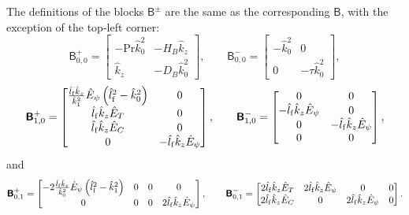 \documentclass{article}
\newcommand{\khat}{\hat{k}}
\newcommand{\lhatf}{\hat{l}_{\rm f}}
\newcommand{\Prd}{\mathrm{Pr}}
\newcommand{\HB}{H_{B}}
\newcommand{\DB}{D_{B}}
\newcommand{\EhatT}{\hat{E}_{T}}
\newcommand{\EhatC}{\hat{E}_{C}}
\newcommand{\Ehatp}{\hat{E}_{\psi}}
\newcommand{\Bmat}{\boldsymbol{\mathsf{B}}}
\begin{document}
%
The definitions of the blocks $\Bmat^{\pm}$ are the same as the
corresponding $\Bmat$, with the exception of the top-left corner:
%
\begin{equation}
  \Bmat_{0,0}^{+} =
  \begin{bmatrix}
    - \Prd \khat_0^2 &
    - \HB \khat_z \\
    \khat_z &
    - \DB \khat_0^2
  \end{bmatrix},
  \qquad
  \Bmat_{0,0}^{-} =
  \begin{bmatrix}
    - \khat_0^2 &
    0 \\
    0 &
    -\tau \khat_0^2
  \end{bmatrix},
\end{equation}
%
\begin{equation}
  \Bmat_{1,0}^{+} =
  \begin{bmatrix}
    \frac{\lhatf \khat_z}{\khat^2_1} \Ehatp \left( \lhatf^2 - \khat^2_{0} \right) &
    0 \\
    \lhatf \khat_z \EhatT &
    0 \\
    \lhatf \khat_z \EhatC &
    0 \\
    0 &
    -\lhatf \khat_z \Ehatp
  \end{bmatrix},
  \qquad
  \Bmat_{1,0}^{-} =
  \begin{bmatrix}
    0 &
    0 \\
    -\lhatf \khat_z \Ehatp &
    0 \\
    0 & 
    -\lhatf \khat_z \Ehatp \\
    0 &
    0
  \end{bmatrix},
\end{equation}
%
and
%
\begin{equation}
  \Bmat_{0,1}^{+} =
  \begin{bmatrix}
    - 2 \frac{\lhatf \khat_z}{\khat^2_0} \Ehatp \left( \lhatf^2 - \khat^2_{1} \right) &
    0 &
    0 &
    0 \\
    0 &
    0 &
    0 &
    2 \lhatf \khat_z \Ehatp
  \end{bmatrix},
  \qquad
  \Bmat_{0,1}^{-} =
  \begin{bmatrix}
    2 \lhatf \khat_z \EhatT &
    2 \lhatf \khat_z \Ehatp &
    0 &
    0 \\
    2 \lhatf \khat_z \EhatC &
    0 &
    2 \lhatf \khat_z \Ehatp &
    0
  \end{bmatrix}.
\end{equation}
\end{document}
